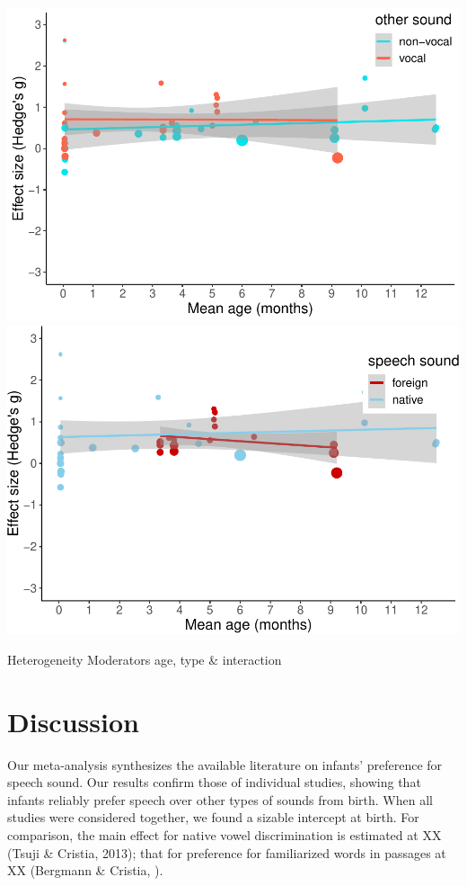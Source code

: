 \documentclass[man]{apa6}
\begin{document}
\includegraphics{MA_speech_pref_files/figure-latex/plots-4.pdf}
\includegraphics{MA_speech_pref_files/figure-latex/plots-5.pdf}

Heterogeneity Moderators age, type \& interaction

\section{Discussion}\label{discussion}

Our meta-analysis synthesizes the available literature on infants'
preference for speech sound. Our results confirm those of individual
studies, showing that infants reliably prefer speech over other types of
sounds from birth. When all studies were considered together, we found a
sizable intercept at birth. For comparison, the main effect for native
vowel discrimination is estimated at XX (Tsuji \& Cristia, 2013); that
for preference for familiarized words in passages at XX (Bergmann \&
Cristia, ).
\end{document}
